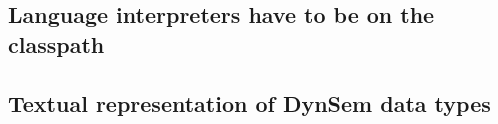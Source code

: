 \subsection{Language interpreters have to be on the classpath}
\label{sec:discuss-classpath}

\subsection{Textual representation of DynSem data types}
\label{sec:discuss-dynsem-string}
